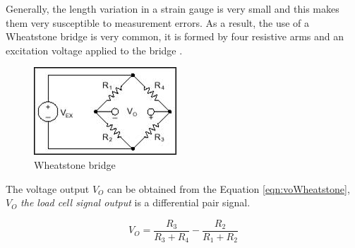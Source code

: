 	Generally, the length variation in a strain gauge is very small and this makes them very susceptible to measurement errors. As a result, the use of a Wheatstone bridge is very common, it is formed by four resistive arms and an excitation voltage applied to the bridge \cite{window1982strain}.

	\begin{figure}[htbp]
		\centering
			\includegraphics[scale=1.45]{figuras/fig-wheatstone.jpg}
		\caption{Wheatstone bridge \cite{wheat-bridge}}
		\label{fig:wheatstone}
	\end{figure}

	The voltage output $V_{O}$ can be obtained from the Equation \ref{eqn:voWheatstone}, $V_{O}$ \textit{the load cell signal output} is a differential pair signal.

	\begin{equation}\label{eqn:voWheatstone}
		V_{O}=\frac{ R_{3} }{ R_{3} + R_{4} } - \frac{ R_{2} }{ R_{1} + R_{2}}
	\end{equation}